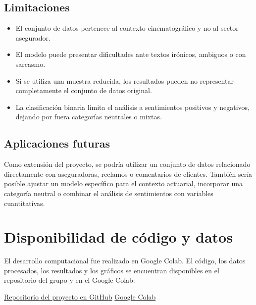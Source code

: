 \documentclass[11pt,letterpaper]{article}
\begin{document}
	\subsection{Limitaciones}
	
	\begin{itemize}
		\item El conjunto de datos pertenece al contexto cinematográfico y no al sector asegurador.
		\item El modelo puede presentar dificultades ante textos irónicos, ambiguos o con sarcasmo.
		\item Si se utiliza una muestra reducida, los resultados pueden no representar completamente el conjunto de datos original.
		\item La clasificación binaria limita el análisis a sentimientos positivos y negativos, dejando por fuera categorías neutrales o mixtas.
	\end{itemize}
	
	\subsection{Aplicaciones futuras}
	
	Como extensión del proyecto, se podría utilizar un conjunto de datos relacionado directamente con aseguradoras, reclamos o comentarios de clientes. También sería posible ajustar un modelo específico para el contexto actuarial, incorporar una categoría neutral o combinar el análisis de sentimientos con variables cuantitativas.
	
	\section{Disponibilidad de código y datos}
	
	El desarrollo computacional fue realizado en Google Colab. El código, los datos procesados, los resultados y los gráficos se encuentran disponibles en el repositorio del grupo y en el Google Colab:
	
	\begin{center}
		\href{https://github.com/JavaLuisdi/CA0305---Proyecto-grupal}{Repositorio del proyecto en GitHub}
		\quad
		\href{https://colab.research.google.com/drive/1K8V-G299sKaaA0yxnt4jAEjhzKXfEFx8?usp=sharing#scrollTo=JKRvCUxRTkJs}{Google Colab}
	\end{center}
	
	
\end{document}
